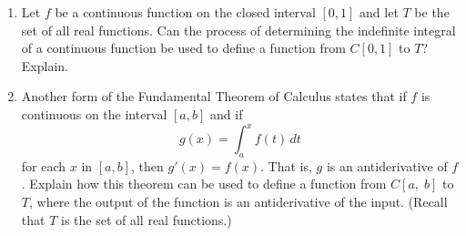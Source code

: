 \begin{enumerate}
\begin{enumerate}
\item Let  $f$  be a continuous function on the closed interval  $\left[ {0, 1} \right]$
  and let  $T$  be the set of all real functions.  Can the process of determining the indefinite integral of a continuous function be used to define a function from $C{\left[ {0, 1} \right]}$ to  $T$?  Explain.

\item Another form of the Fundamental Theorem of Calculus states that if  $f$  is continuous on the interval  $\left[ {a, b} \right]$ and if  
\[
g( x ) = \int_a^x {f( t ) \, dt}
\]
for each  $x$  in  $\left[ {a, b} \right]$, then  $g'\left( x \right) = f\left( x \right)$.  That is,  $g$  is an antiderivative of  $f$.  Explain how this theorem can be used to define a function from $C{\left[ {a,\;b} \right]} $ to  $T$\!,   where the output of the function is an antiderivative of the input.  (Recall that  $T$  is the set of all real functions.)
\end{enumerate}
\end{enumerate}
\hbreak

\endinput
